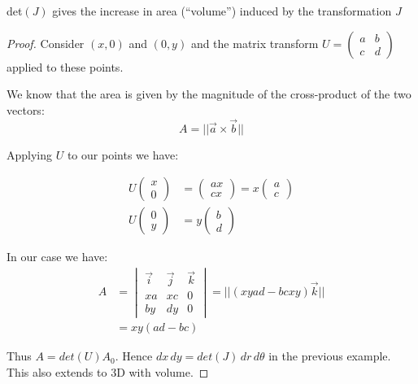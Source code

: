 \documentclass[twoside]{scrartcl}
\begin{document}
\begin{theorem}
det$(J)$ gives the increase in area (``volume'') induced by the transformation  $J$\end{theorem}

\begin{proof}

 Consider $(x,0)$ and $(0,y)$ and the matrix transform $U = \begin{pmatrix}
 a & b \\ c & d	
 \end{pmatrix}$ applied to these points. 

We know that the area is given by the magnitude of the cross-product of the two vectors: 
 \[A = || \vec{a} \times \vec{b}||\]
 
Applying $U$ to our points we have: 

\[
\begin{aligned}
  U\begin{pmatrix}
  x\\0
  \end{pmatrix}
  &= \begin{pmatrix}
 ax\\ cx	
 \end{pmatrix}
 = x\begin{pmatrix}
a \\ c	
\end{pmatrix}\\
  U\begin{pmatrix}
  0\\y
  \end{pmatrix}
 &= y\begin{pmatrix}
b \\ d
\end{pmatrix}
\end{aligned}
\]

In our case we have: 
\[
\begin{aligned}
  A &= \begin{vmatrix}
 \vec{i} & \vec{j} & \vec{k}\\
 xa & xc & 0\\
 by & dy & 0	
 \end{vmatrix}
= || (xyad - bcxy)\vec{k}||\\
&= xy(ad -bc)
\end{aligned}
\]	

Thus $A = det(U)A_0$. Hence $dx\,dy = det(J)\,dr\,d\theta$ in the previous example. This also extends to 3D with volume.
\end{proof}~
\end{document}
